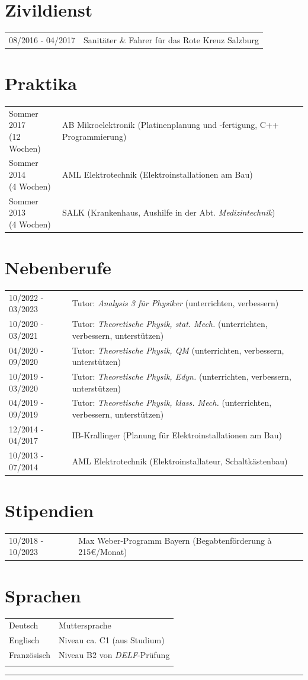 \documentclass[german,10pt]{article}
\begin{document}
	\section*{Zivildienst}
	\begin{tabular}{m{3cm}|l}
		08/2016 - 04/2017 & Sanitäter \& Fahrer für das Rote Kreuz Salzburg
	\end{tabular}
	
	\section*{Praktika}
	\begin{tabular}{m{3cm}|l}
		\makecell{Sommer 2017\\(12 Wochen)} & AB Mikroelektronik (Platinenplanung und -fertigung, C++ Programmierung)\\
		\makecell{Sommer 2014\\(4 Wochen)} & AML Elektrotechnik (Elektroinstallationen am Bau)\\
		\makecell{Sommer 2013\\(4 Wochen)} & SALK (Krankenhaus, Aushilfe in der Abt. \textit{Medizintechnik})
	\end{tabular}
	
	\section*{Nebenberufe}
	\begin{tabular}{m{3cm}|l}
		10/2022 - 03/2023 & Tutor: \textit{Analysis 3 für Physiker} (unterrichten, verbessern)\\
		10/2020 - 03/2021 & Tutor: \textit{Theoretische Physik, stat. Mech.} (unterrichten, verbessern, unterstützen)\\
		04/2020 - 09/2020 & Tutor: \textit{Theoretische Physik, QM} (unterrichten, verbessern, unterstützen)\\
		10/2019 - 03/2020 & Tutor: \textit{Theoretische Physik, Edyn.} (unterrichten, verbessern, unterstützen)\\
		04/2019 - 09/2019 & Tutor: \textit{Theoretische Physik, klass. Mech.} (unterrichten, verbessern, unterstützen)\\
		12/2014 - 04/2017 & IB-Krallinger (Planung für Elektroinstallationen am Bau)\\
		10/2013 - 07/2014 & AML Elektrotechnik (Elektroinstallateur, Schaltkästenbau)
	\end{tabular}
	
	\section*{Stipendien}
	\begin{tabular}{m{3cm}|l}
		10/2018 - 10/2023 & Max Weber-Programm Bayern (Begabtenförderung à 215€/Monat)
	\end{tabular}
	
	\section*{Sprachen}
	\begin{tabular}{m{3cm} | l}
		Deutsch & Muttersprache\\
		Englisch & Niveau ca. C1 (aus Studium)\\
		Französisch & Niveau B2 von \textit{DELF}-Prüfung\\
		&
	\end{tabular}
	\hrule
\end{document}
